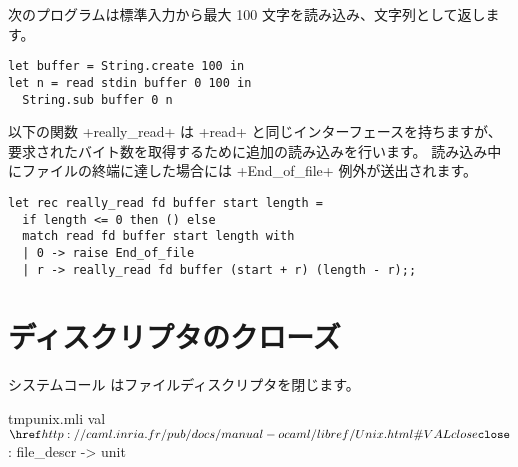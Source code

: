 \begin{example}
次のプログラムは標準入力から最大 100 文字を読み込み、文字列として返します。
%
\begin{lstlisting}
let buffer = String.create 100 in
let n = read stdin buffer 0 100 in
  String.sub buffer 0 n
\end{lstlisting}
\end{example}

\begin{example}
以下の関数 \ml+really_read+ は \ml+read+ と同じインターフェースを持ちますが、
要求されたバイト数を取得するために追加の読み込みを行います。
読み込み中にファイルの終端に達した場合には \ml+End_of_file+ 例外が送出されます。
%
\begin{lstlisting}
let rec really_read fd buffer start length =
  if length <= 0 then () else
  match read fd buffer start length with
  | 0 -> raise End_of_file
  | r -> really_read fd buffer (start + r) (length - r);;
\end{lstlisting}
%
\end{example}

\section{ディスクリプタのクローズ}

システムコール  はファイルディスクリプタを閉じます。
%
\begin{listingcodefile}{tmpunix.mli}
val $\libvalue{Unix}{close}$ : file_descr -> unit
\end{listingcodefile}
%

